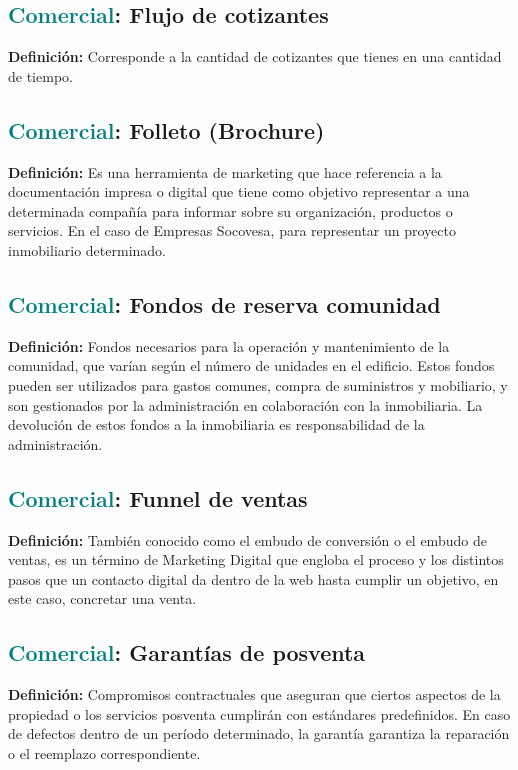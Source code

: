 \documentclass[12pt]{article}
\begin{document}
\subsection{\textcolor{teal}{Comercial}: Flujo de cotizantes}
\textbf{Definición:} Corresponde a la cantidad de cotizantes que tienes en una cantidad de tiempo.
\subsection{\textcolor{teal}{Comercial}: Folleto (Brochure)}
\textbf{Definición:} Es una herramienta de marketing que hace referencia a la documentación impresa o digital que tiene como objetivo representar a una determinada compañía para informar sobre su organización, productos o servicios. En el caso de Empresas Socovesa, para representar un proyecto inmobiliario determinado.
\subsection{\textcolor{teal}{Comercial}: Fondos de reserva comunidad}
\textbf{Definición:} Fondos necesarios para la operación y mantenimiento de la comunidad, que varían según el número de unidades en el edificio. Estos fondos pueden ser utilizados para gastos comunes, compra de suministros y mobiliario, y son gestionados por la administración en colaboración con la inmobiliaria. La devolución de estos fondos a la inmobiliaria es responsabilidad de la administración.
\subsection{\textcolor{teal}{Comercial}: Funnel de ventas}
\textbf{Definición:} También conocido como el embudo de conversión o el embudo de ventas, es un término de Marketing Digital que engloba el proceso y los distintos pasos que un contacto digital da dentro de la web hasta cumplir un objetivo, en este caso, concretar una venta.
\subsection{\textcolor{teal}{Comercial}: Garantías de posventa}
\textbf{Definición:} Compromisos contractuales que aseguran que ciertos aspectos de la propiedad o los servicios posventa cumplirán con estándares predefinidos. En caso de defectos dentro de un período determinado, la garantía garantiza la reparación o el reemplazo correspondiente.
\end{document}
